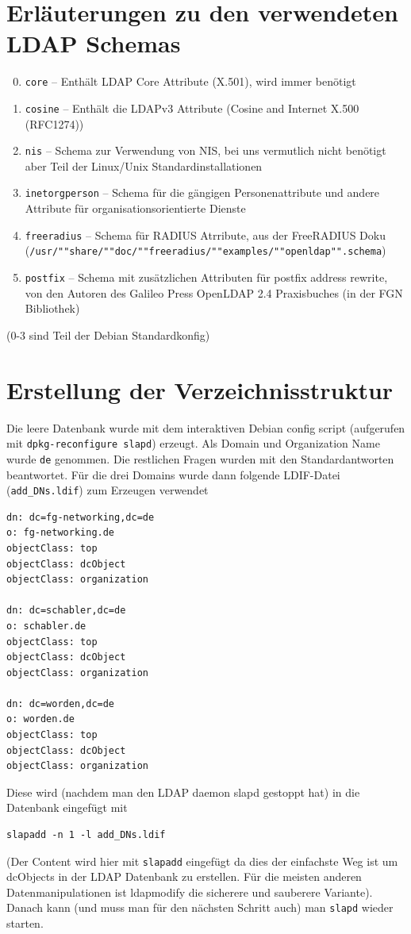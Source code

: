 \documentclass[11pt,a4paper,titlepage=firstiscover,headsepline,bibtotoc]{scrartcl} %
\begin{document}
\section{Erläuterungen zu den verwendeten LDAP Schemas}\label{sec:LDAP-Schema}
\begin{enumerate}
\setcounter{enumi}{-1}
\item \texttt{core} -- Enthält LDAP Core Attribute (X.501), wird immer benötigt
\item \texttt{cosine} -- Enthält die LDAPv3 Attribute (Cosine and Internet X.500 (RFC1274))
\item \texttt{nis} -- Schema zur Verwendung von NIS, bei uns vermutlich nicht benötigt aber Teil der Linux/Unix Standardinstallationen
\item \texttt{inetorgperson} -- Schema für die gängigen Personenattribute und andere Attribute für organisationsorientierte Dienste
\item \texttt{freeradius} -- Schema für RADIUS Atrribute, aus der FreeRADIUS Doku (\texttt{/usr/""share/""doc/""freeradius/""examples/""openldap"".schema})
\item \texttt{postfix} -- Schema mit zusätzlichen Attributen für postfix address rewrite, von den Autoren des Galileo Press OpenLDAP 2.4 Praxisbuches (in der FGN Bibliothek)
\end{enumerate}
(0-3 sind Teil der Debian Standardkonfig)

\newpage
\section{Erstellung der Verzeichnisstruktur}\label{sec:Erstelle-DB}
Die leere Datenbank wurde mit dem interaktiven Debian config script (aufgerufen mit \texttt{dpkg-reconfigure slapd}) erzeugt. Als Domain und Organization Name wurde \texttt{de} genommen. Die restlichen Fragen wurden mit den Standardantworten beantwortet. Für die drei Domains wurde dann folgende LDIF-Datei (\texttt{add\_DNs.ldif}) zum Erzeugen verwendet
\begin{lstlisting}
dn: dc=fg-networking,dc=de
o: fg-networking.de
objectClass: top
objectClass: dcObject
objectClass: organization

dn: dc=schabler,dc=de
o: schabler.de
objectClass: top
objectClass: dcObject
objectClass: organization

dn: dc=worden,dc=de
o: worden.de
objectClass: top
objectClass: dcObject
objectClass: organization

\end{lstlisting}
Diese wird (nachdem man den LDAP daemon slapd gestoppt hat) in die Datenbank eingefügt mit
\begin{lstlisting}
slapadd -n 1 -l add_DNs.ldif
\end{lstlisting}
(Der Content wird hier mit \texttt{slapadd} eingefügt da dies der einfachste Weg ist um dcObjects in der LDAP Datenbank zu erstellen. Für die meisten anderen Datenmanipulationen ist ldapmodify die sicherere und sauberere Variante). Danach kann (und muss man für den nächsten Schritt auch) man \texttt{slapd} wieder starten.
\end{document}
